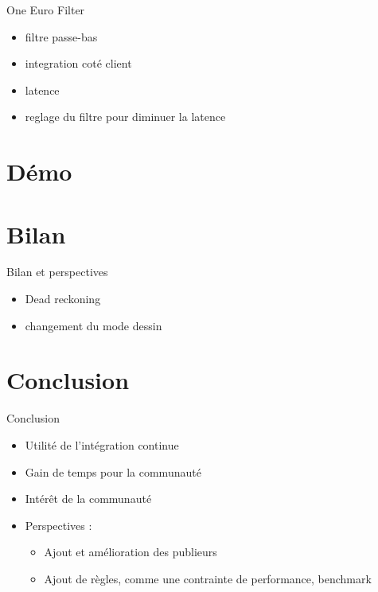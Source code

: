 \documentclass[12pt]{beamer}
\begin{document}
\begin{frame}{One Euro Filter}
	\begin{itemize}
		\item filtre passe-bas
		\item integration coté client
		\item latence
		\item reglage du filtre pour diminuer la latence
	\end{itemize}
\end{frame}

\section{Démo }


\section{Bilan}
\begin{frame}{Bilan et perspectives}
	\begin{itemize}
		\item Dead reckoning
		\item changement du mode dessin
	\end{itemize}
\end{frame}



\section{Conclusion}
\begin{frame}{Conclusion}
	\begin{itemize}
		\item Utilité de l'intégration continue
		\item Gain de temps pour la communauté
		\item Intérêt de la communauté
		\item Perspectives : 
		\begin{itemize}
			\item Ajout et amélioration des publieurs
			\item Ajout de règles, comme une contrainte de performance, benchmark
		\end{itemize}
	\end{itemize}
\end{frame}
\end{document}
